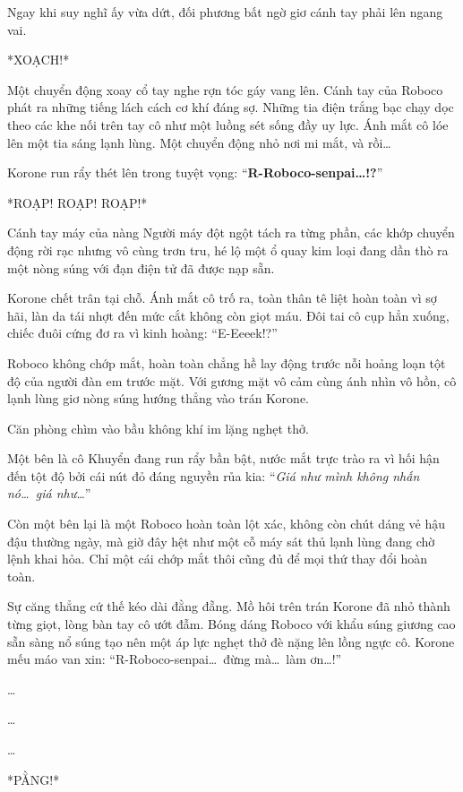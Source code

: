 \documentclass[../main.tex]{subfiles}
\begin{document}
Ngay khi suy nghĩ ấy vừa dứt, đối phương bất ngờ giơ cánh tay phải lên ngang vai.

*XOẠCH!*

Một chuyển động xoay cổ tay nghe rợn tóc gáy vang lên. Cánh tay của Roboco phát ra những tiếng lách cách cơ khí đáng sợ. Những tia điện trắng bạc chạy dọc theo các khe nối trên tay cô như một luồng sét sống đầy uy lực. Ánh mắt cô lóe lên một tia sáng lạnh lùng. Một chuyển động nhỏ nơi mi mắt, và rồi\dots

Korone run rẩy thét lên trong tuyệt vọng: ``\textbf{R-Roboco-senpai\dots!?}''

*ROẠP! ROẠP! ROẠP!*

Cánh tay máy của nàng Người máy đột ngột tách ra từng phần, các khớp chuyển động rời rạc nhưng vô cùng trơn tru, hé lộ một ổ quay kim loại đang dần thò ra một nòng súng với đạn điện tử đã được nạp sẵn.

Korone chết trân tại chỗ. Ánh mắt cô trố ra, toàn thân tê liệt hoàn toàn vì sợ hãi, làn da tái nhợt đến mức cắt không còn giọt máu. Đôi tai cô cụp hẳn xuống, chiếc đuôi cứng đơ ra vì kinh hoàng: ``E-Eeeek!?''

Roboco không chớp mắt, hoàn toàn chẳng hề lay động trước nỗi hoảng loạn tột độ của người đàn em trước mặt. Với gương mặt vô cảm cùng ánh nhìn vô hồn, cô lạnh lùng giơ nòng súng hướng thẳng vào trán Korone.


Căn phòng chìm vào bầu không khí im lặng nghẹt thở.

Một bên là cô Khuyển đang run rẩy bần bật, nước mắt trực trào ra vì hối hận đến tột độ bởi cái nút đỏ đáng nguyền rủa kia: ``\textit{Giá như mình không nhấn nó\dots\ giá như\dots}''

Còn một bên lại là một Roboco hoàn toàn lột xác, không còn chút dáng vẻ hậu đậu thường ngày, mà giờ đây hệt như một cỗ máy sát thủ lạnh lùng đang chờ lệnh khai hỏa. Chỉ một cái chớp mắt thôi cũng đủ để mọi thứ thay đổi hoàn toàn.

Sự căng thẳng cứ thế kéo dài đằng đẵng. Mồ hôi trên trán Korone đã nhỏ thành từng giọt, lòng bàn tay cô ướt đẫm. Bóng dáng Roboco với khẩu súng giương cao sẵn sàng nổ súng tạo nên một áp lực nghẹt thở đè nặng lên lồng ngực cô. Korone mếu máo van xin: ``R-Roboco-senpai\dots\ đừng mà\dots\ làm ơn\dots!''

\dots

\dots

\dots

*PẰNG!*
\end{document}

